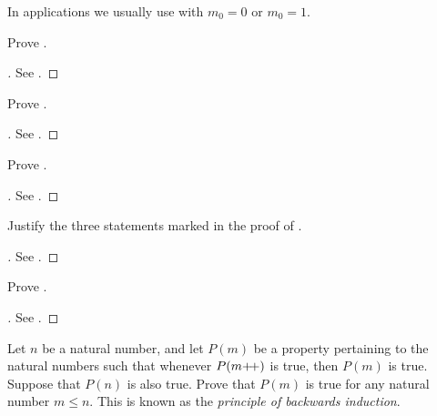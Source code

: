 \begin{rmk}\label{i:2.2.15}
  In applications we usually use  with \(m_0 = 0\) or \(m_0 = 1\).
\end{rmk}

\exercisesection

\begin{ex}\label{i:ex:2.2.1}
  Prove .
\end{ex}

\begin{proof}[]
  See .
\end{proof}

\begin{ex}\label{i:ex:2.2.2}
  Prove .
\end{ex}

\begin{proof}[]
  See .
\end{proof}

\begin{ex}\label{i:ex:2.2.3}
  Prove .
\end{ex}

\begin{proof}[]
  See .
\end{proof}

\begin{ex}\label{i:ex:2.2.4}
  Justify the three statements marked in the proof of .
\end{ex}

\begin{proof}[]
  See .
\end{proof}

\begin{ex}\label{i:ex:2.2.5}
  Prove .
\end{ex}

\begin{proof}[]
  See .
\end{proof}

\begin{ex}\label{i:ex:2.2.6}
  Let \(n\) be a natural number, and let \(P(m)\) be a property pertaining to the natural numbers such that whenever \(P(m{+}\!{+})\) is true, then \(P(m)\) is true.
  Suppose that \(P(n)\) is also true.
  Prove that \(P(m)\) is true for any natural number \(m \leq n\).
  This is known as the \emph{principle of backwards induction}.
\end{ex}

